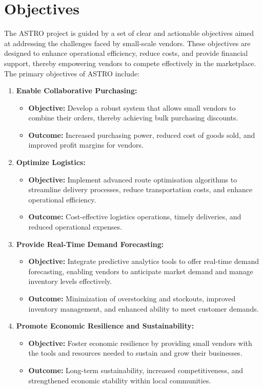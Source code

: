 \section{Objectives}
The ASTRO project is guided by a set of clear and actionable objectives aimed at addressing the challenges faced by small-scale vendors. These objectives are designed to enhance operational efficiency, reduce costs, and provide financial support, thereby empowering vendors to compete effectively in the marketplace. The primary objectives of ASTRO include:

\begin{enumerate}
	\item \textbf{Enable Collaborative Purchasing:}
	      \begin{itemize}
		      \item \textbf{Objective:} Develop a robust system that allows small vendors to combine their orders, thereby achieving bulk purchasing discounts.
		      \item \textbf{Outcome:} Increased purchasing power, reduced cost of goods sold, and improved profit margins for vendors.
	      \end{itemize}

	\item \textbf{Optimize Logistics:}
	      \begin{itemize}
		      \item \textbf{Objective:} Implement advanced route optimisation algorithms to streamline delivery processes, reduce transportation costs, and enhance operational efficiency.
		      \item \textbf{Outcome:} Cost-effective logistics operations, timely deliveries, and reduced operational expenses.
	      \end{itemize}

	\item \textbf{Provide Real-Time Demand Forecasting:}
	      \begin{itemize}
		      \item \textbf{Objective:} Integrate predictive analytics tools to offer real-time demand forecasting, enabling vendors to anticipate market demand and manage inventory levels effectively.
		      \item \textbf{Outcome:} Minimization of overstocking and stockouts, improved inventory management, and enhanced ability to meet customer demands.
	      \end{itemize}


	\item \textbf{Promote Economic Resilience and Sustainability:}
	      \begin{itemize}
		      \item \textbf{Objective:} Foster economic resilience by providing small vendors with the tools and resources needed to sustain and grow their businesses.
		      \item \textbf{Outcome:} Long-term sustainability, increased competitiveness, and strengthened economic stability within local communities.
	      \end{itemize}


\end{enumerate}

